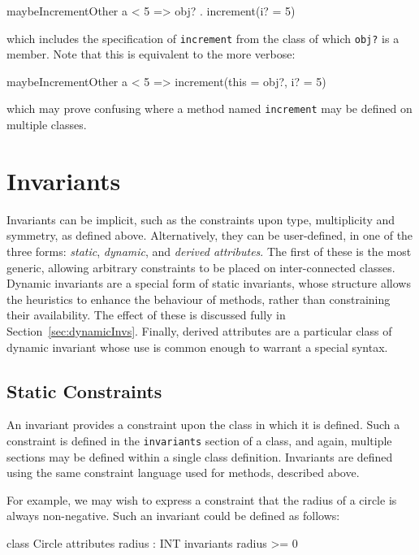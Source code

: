 \begin{code}
  maybeIncrementOther { a < 5 => obj? . increment(i? = 5) }
\end{code}

which includes the specification of \verb|increment| from the class of which
\verb|obj?| is a member.  Note that this is equivalent to the more verbose:

\begin{code}
  maybeIncrementOther { a < 5 => increment(this = obj?, i? = 5) }
\end{code}

which may prove confusing where a method named \verb|increment| may be
defined on multiple classes.

\section{Invariants}

Invariants can be implicit, such as the constraints upon type,
multiplicity and symmetry, as defined above.  Alternatively, they can
be user-defined, in one of the three forms: \emph{static},
\emph{dynamic}, and \emph{derived attributes}.  The first of these is
the most generic, allowing arbitrary constraints to be placed on
inter-connected classes.  Dynamic invariants are a special form of
static invariants, whose structure allows the heuristics to enhance
the behaviour of methods, rather than constraining their
availability.  The effect of these is discussed fully in
Section~\ref{sec:dynamicInvs}.  Finally, derived attributes are a
particular class of dynamic invariant whose use is common enough to
warrant a special syntax.



\subsection{Static Constraints}
An invariant provides a constraint upon the class in which it is
defined.  Such a constraint is defined in the \verb|invariants|
section of a class, and again, multiple sections may be defined within a
single class definition.  Invariants are defined using the same constraint
language used for methods, described above.

For example, we may wish to express a constraint that the radius of a
circle is always non-negative.  Such an invariant could be defined as
follows:

\begin{code}
class Circle {
  attributes
    radius : INT
  invariants
    radius >= 0
}
\end{code}

